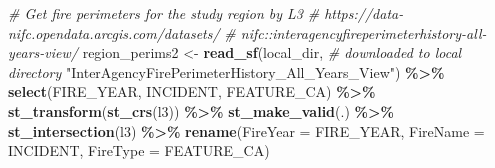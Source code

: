 \documentclass[
]{article}
\newenvironment{Shaded}{\begin{snugshade}}{\end{snugshade}}
\newcommand{\AttributeTok}[1]{\textcolor[rgb]{0.13,0.29,0.53}{#1}}
\newcommand{\CommentTok}[1]{\textcolor[rgb]{0.56,0.35,0.01}{\textit{#1}}}
\newcommand{\FunctionTok}[1]{\textcolor[rgb]{0.13,0.29,0.53}{\textbf{#1}}}
\newcommand{\NormalTok}[1]{#1}
\newcommand{\OtherTok}[1]{\textcolor[rgb]{0.56,0.35,0.01}{#1}}
\newcommand{\SpecialCharTok}[1]{\textcolor[rgb]{0.81,0.36,0.00}{\textbf{#1}}}
\newcommand{\StringTok}[1]{\textcolor[rgb]{0.31,0.60,0.02}{#1}}
\begin{document}
\begin{Shaded}
\begin{Highlighting}[]
\CommentTok{\# Get fire perimeters for the study region by L3}
  \CommentTok{\# https://data{-}nifc.opendata.arcgis.com/datasets/}
  \CommentTok{\# nifc::interagencyfireperimeterhistory{-}all{-}years{-}view/}
\NormalTok{region\_perims2 }\OtherTok{\textless{}{-}}
  \FunctionTok{read\_sf}\NormalTok{(local\_dir, }\CommentTok{\# downloaded to local directory}
          \StringTok{"InterAgencyFirePerimeterHistory\_All\_Years\_View"}\NormalTok{) }\SpecialCharTok{\%\textgreater{}\%}
    \FunctionTok{select}\NormalTok{(FIRE\_YEAR, INCIDENT, FEATURE\_CA) }\SpecialCharTok{\%\textgreater{}\%}
    \FunctionTok{st\_transform}\NormalTok{(}\FunctionTok{st\_crs}\NormalTok{(l3)) }\SpecialCharTok{\%\textgreater{}\%}
    \FunctionTok{st\_make\_valid}\NormalTok{(.) }\SpecialCharTok{\%\textgreater{}\%}
    \FunctionTok{st\_intersection}\NormalTok{(l3) }\SpecialCharTok{\%\textgreater{}\%}
    \FunctionTok{rename}\NormalTok{(}\AttributeTok{FireYear =}\NormalTok{ FIRE\_YEAR, }\AttributeTok{FireName =}\NormalTok{ INCIDENT, }\AttributeTok{FireType =}\NormalTok{ FEATURE\_CA)}


\end{Highlighting}
\end{Shaded}
\end{document}
